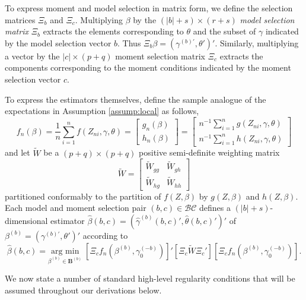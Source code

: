 To express moment and model selection in matrix form, we define the selection matrices $\Xi_b$ and $\Xi_c$.
Multiplying $\beta$ by the $(|b| + s)\times(r+s)$ \emph{model selection matrix} $\Xi_b$ extracts the elements corresponding to $\theta$ and the subset of $\gamma$ indicated by the model selection vector $b$. 
Thus $\Xi_b \beta = \left(\gamma^{(b)'}, \theta' \right)'$.
Similarly, multiplying a vector by the $|c|\times(p+q)$ moment selection matrix $\Xi_c$ extracts the components corresponding to the moment conditions indicated by the moment selection vector $c$. 

To express the estimators themselves, define the sample analogue of the expectations in Assumption \ref{assump:local} as follows,
\begin{equation}
	f_n(\beta) = \frac{1}{n}\sum_{i=1}^n f(Z_{ni}, \gamma, \theta) = \left[\begin{array}{c}g_n(\beta)\\ h_n(\beta) \end{array} \right] = \left[\begin{array}{c} n^{-1}\sum_{i=1}^n g(Z_{ni}, \gamma, \theta)\\n^{-1}\sum_{i=1}^n h(Z_{ni}, \gamma, \theta) \end{array}\right]
\end{equation}
and let $\widetilde{W}$ be a $(p+q)\times(p+q)$ positive semi-definite weighting matrix
\begin{equation}
	\widetilde{W} = \left[\begin{array}{cc} \widetilde{W}_{gg} & \widetilde{W}_{gh}\\ \widetilde{W}_{hg} & \widetilde{W}_{hh}  \end{array}\right]
\end{equation}
partitioned conformably to the partition of $f(Z,\beta)$ by $g(Z,\beta)$ and $h(Z,\beta)$. Each model and moment selection pair $(b,c)\in \mathcal{BC}$ defines a $(|b|+s)$-dimensional estimator $\widehat{\beta}(b,c)=( \widehat{\gamma}^{(b)}(b,c)',\widehat{\theta}(b,c)')'$ of $\beta^{(b)}= \left(\gamma^{(b)'}, \theta'  \right)'$ according to
	\begin{equation}
    \widehat{\beta}(b,c) = \underset{\beta^{(b)}\in \mathbf{B}^{(b)}} {\mbox{arg min}}\;\left[\Xi_c f_n\left(\beta^{(b)}, \gamma_0^{(-b)}\right)\right]'\left[\Xi_c \widetilde{W}\Xi_c' \right]\left[\Xi_c f_n\left(\beta^{(b)}, \gamma_0^{(-b)}\right)\right].
	\end{equation}

We now state a number of standard high-level regularity conditions that will be assumed throughout our derivations below.

